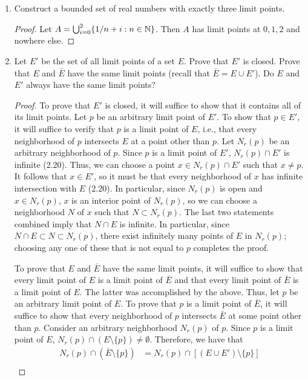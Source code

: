 \documentclass[../psets.tex]{subfiles}
\begin{document}
\begin{enumerate}[label={\textbf{\arabic*.}}]
\begin{proof}
    \end{proof}
    \item Construct a bounded set of real numbers with exactly three limit points.
    \begin{proof}
        Let $A=\bigcup_{i=0}^2\{1/n+i:n\in\mathbb{N}\}$. Then $A$ has limit points at $0,1,2$ and nowhere else.
    \end{proof}
    \item Let $E'$ be the set of all limit points of a set $E$. Prove that $E'$ is closed. Prove that $E$ and $\bar{E}$ have the same limit points (recall that $\bar{E}=E\cup E'$). Do $E$ and $E'$ always have the same limit points?
    \begin{proof}
        To prove that $E'$ is closed, it will suffice to show that it contains all of its limit points. Let $p$ be an arbitrary limit point of $E'$. To show that $p\in E'$, it will suffice to verify that $p$ is a limit point of $E$, i.e., that every neighborhood of $p$ intersects $E$ at a point other than $p$. Let $N_r(p)$ be an arbitrary neighborhood of $p$. Since $p$ is a limit point of $E'$, $N_r(p)\cap E'$ is infinite (2.20). Thus, we can choose a point $x\in N_r(p)\cap E'$ such that $x\neq p$. It follows that $x\in E'$, so it must be that every neighborhood of $x$ has infinite intersection with $E$ (2.20). In particular, since $N_r(p)$ is open and $x\in N_r(p)$, $x$ is an interior point of $N_r(p)$, so we can choose a neighborhood $N$ of $x$ such that $N\subset N_r(p)$. The last two statements combined imply that $N\cap E$ is infinite. In particular, since $N\cap E\subset N\subset N_r(p)$, there exist infinitely many points of $E$ in $N_r(p)$; choosing any one of these that is not equal to $p$ completes the proof.\par
        To prove that $E$ and $\bar{E}$ have the same limit points, it will suffice to show that every limit point of $E$ is a limit point of $\bar{E}$ and that every limit point of $\bar{E}$ is a limit point of $E$. The latter was accomplished by the above. Thus, let $p$ be an arbitrary limit point of $E$. To prove that $p$ is a limit point of $\bar{E}$, it will suffice to show that every neighborhood of $p$ intersects $\bar{E}$ at some point other than $p$. Consider an arbitrary neighborhood $N_r(p)$ of $p$. Since $p$ is a limit point of $E$, $N_r(p)\cap(E\setminus\{p\})\neq\emptyset$. Therefore, we have that
        \begin{align*}
            N_r(p)\cap(\bar{E}\setminus\{p\}) &= N_r(p)\cap[(E\cup E')\setminus\{p\}]\\

\end{align*}
\end{proof}
\end{enumerate}
\end{document}
